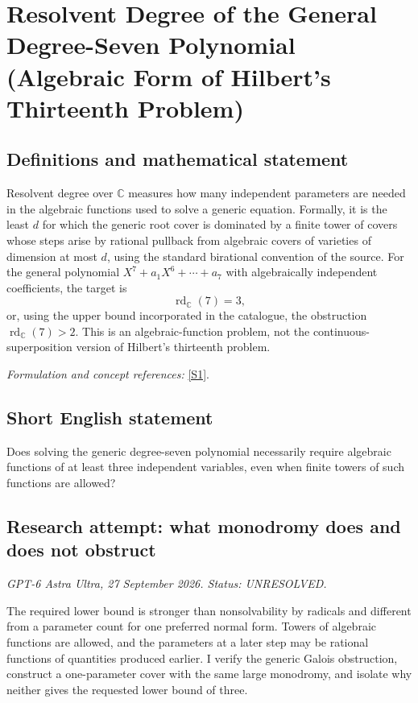 \documentclass[11pt]{article}
\begin{document}
\section*{\texorpdfstring{Resolvent Degree of the General Degree-Seven Polynomial (Algebraic Form of Hilbert's Thirteenth Problem)}{Resolvent Degree of the General Degree-Seven Polynomial (Algebraic Form of Hilbert's Thirteenth Problem)}}\label{30006834}
\subsection{Definitions and mathematical statement}
Resolvent degree over ${\mathbb{C}}$ measures how many independent parameters are needed in the algebraic functions used to solve a generic equation. Formally, it is the least $d$ for which the generic root cover is dominated by a finite tower of covers whose steps arise by rational pullback from algebraic covers of varieties of dimension at most $d$, using the standard birational convention of the source. For the general polynomial
$X^7+a_1X^6+\cdots+a_7$ with algebraically independent coefficients, the target is
\[
 \operatorname{rd}_{{\mathbb{C}}}(7)=3,
\]
or, using the upper bound incorporated in the catalogue, the obstruction $\operatorname{rd}_{{\mathbb{C}}}(7)>2$. This is an algebraic-function problem, not the continuous-superposition version of Hilbert's thirteenth problem.
\par\smallskip\textit{Formulation and concept references:} \href{https://iopscience.iop.org/article/10.1070/RM2004v059n01ABEH000698}{[S1]}.

\subsection{Short English statement}
Does solving the generic degree-seven polynomial necessarily require algebraic functions of at least three independent variables, even when finite towers of such functions are allowed?
\subsection{Research attempt: what monodromy does and does not obstruct}
\textit{GPT-6 Astra Ultra, 27 September 2026. Status: UNRESOLVED.}

The required lower bound is stronger than nonsolvability by radicals and different from a parameter count for one preferred normal form. Towers of algebraic functions are allowed, and the parameters at a later step may be rational functions of quantities produced earlier. I verify the generic Galois obstruction, construct a one-parameter cover with the same large monodromy, and isolate why neither gives the requested lower bound of three.
\end{document}
